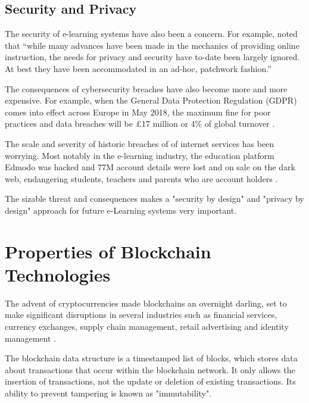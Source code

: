 \subsection{Security and Privacy}

The security of e-learning systems have also been a concern. For example, \citet{el2003privacy} noted that “while many 
advances have been made in the mechanics of providing online instruction, the needs for privacy and security have to-date 
been largely ignored. At best they have been accommodated in an ad-hoc, patchwork fashion.”

The consequences of cybersecurity breaches have also become more and more expensive. For example, when the General Data 
Protection Regulation (GDPR) comes into effect across Europe in May 2018, the maximum fine for poor practices and data 
breaches will be £17 million or 4\% of global turnover \citep{ico2017gdpr}.

The scale and severity of historic breaches of of internet services has been worrying. Most notably in the e-learning 
industry, the education platform Edmodo was hacked and 77M account details were lost and on sale on the dark 
web, endangering students, teachers and parents who are account holders \citep{opsecmonkey2017edmodo}.

The sizable threat and consequences makes a "security by design" and "privacy by design" approach for future e-Learning 
systems very important.

\section{Properties of Blockchain Technologies}

The advent of cryptocurrencies made blockchains an overnight darling, set to make significant disruptions 
in several industries such as financial services, currency exchanges, supply chain management, retail 
advertising and identity management \citep{forbes2017industries}.

The blockchain data structure is a timestamped list of blocks, which stores data about transactions
that occur within the blockchain network. It only allows the insertion of transactions, not the update 
or deletion of existing transactions. Its ability to prevent tampering is known as "immutability". \citep[p.182]{xu2016blockchain}

